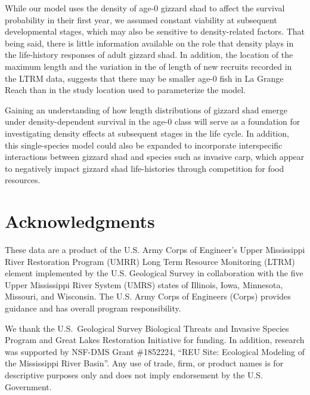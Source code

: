 \documentclass[preprint,review,12pt,authoryear]{elsarticle}
\begin{document}
While our model uses the density of age-0 gizzard shad to affect the survival probability in their first year, we assumed constant viability at subsequent developmental stages, which may also be sensitive to density-related factors.  That being said, there is little information available on the role that density plays in the life-history responses of adult gizzard shad. In addition, the location of the maximum length and the variation in the of length of new recruits recorded in the LTRM data, suggests that there may be smaller age-0 fish in La Grange Reach than in the study location \citep{michaletz2017variation} used to parameterize the model.  

Gaining an understanding of how length distributions of gizzard shad emerge under density-dependent survival in the age-0 class will serve as a foundation for investigating density effects at subsequent stages in the life cycle.  
In addition, this single-species model could also be expanded to incorporate interspecific interactions between gizzard shad and species such as invasive carp, which appear to negatively impact gizzard shad life-histories through competition for food resources.   

\section{Acknowledgments}

These data are a product of the U.S. Army Corps of Engineer's Upper Mississippi River Restoration Program (UMRR) Long Term Resource Monitoring (LTRM) element implemented by the U.S. Geological Survey in collaboration with the five Upper Mississippi River System (UMRS) states of Illinois, Iowa, Minnesota, Missouri, and Wisconsin.
The U.S. Army Corps of Engineers (Corps) provides guidance and has overall program responsibility.

We thank the U.S.~Geological Survey  Biological Threats and Invasive Species Program and Great Lakes Restoration Initiative for funding.
In addition, research was supported by NSF-DMS Grant \#1852224, ``REU Site: Ecological Modeling of the Mississippi River Basin''. Any use of trade, firm, or product names is for descriptive purposes only and does not imply endorsement by the U.S. Government.

  
 
\end{document}
